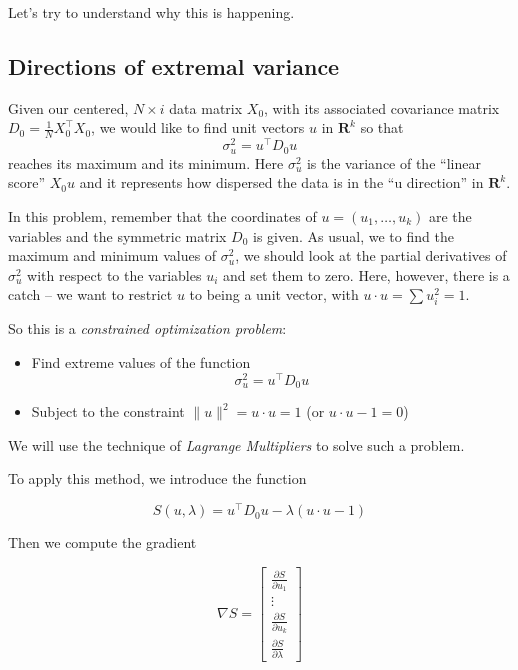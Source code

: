 \documentclass[
  oneside]{scrbook}
\providecommand{\tightlist}{%
  \setlength{\itemsep}{0pt}\setlength{\parskip}{0pt}}
\begin{document}
Let's try to understand why this is happening.

\hypertarget{sec:extremalvariance}{%
\subsection{Directions of extremal
variance}\label{sec:extremalvariance}}

Given our centered, \(N\times i\) data matrix \(X_{0}\), with its
associated covariance matrix
\(D_{0}=\frac{1}{N}X_{0}^{\intercal}X_{0}\), we would like to find unit
vectors \(u\) in \(\mathbf{R}^{k}\) so that \[
\sigma_{u}^{2} = u^{\intercal}D_{0}u
\] reaches its maximum and its minimum. Here \(\sigma_{u}^2\) is the
variance of the ``linear score'' \(X_{0}u\) and it represents how
dispersed the data is in the ``u direction'' in \(\mathbf{R}^{k}\).

In this problem, remember that the coordinates of
\(u=(u_1,\ldots, u_{k})\) are the variables and the symmetric matrix
\(D_{0}\) is given. As usual, we to find the maximum and minimum values
of \(\sigma_{u}^{2}\), we should look at the partial derivatives of
\(\sigma_{u}^{2}\) with respect to the variables \(u_{i}\) and set them
to zero. Here, however, there is a catch -- we want to restrict \(u\) to
being a unit vector, with \(u\cdot u =\sum u_{i}^2=1\).

So this is a \emph{constrained optimization problem}:

\begin{itemize}
\tightlist
\item
  Find extreme values of the function \[
  \sigma_{u}^{2} = u^{\intercal}D_{0}u
  \]
\item
  Subject to the constraint \(\|u\|^2 = u\cdot u=1\) (or
  \(u\cdot u-1=0\))
\end{itemize}

We will use the technique of \emph{Lagrange Multipliers} to solve such a
problem.

To apply this method, we introduce the function

\begin{equation}
S(u, \lambda) = u^{\intercal}D_{0}u - \lambda(u\cdot u -1)
\label{eq:lagrange}\end{equation}

Then we compute the gradient

\begin{equation}
\nabla S = \left[\begin{matrix} \frac{\partial S}{\partial u_{1}} \\ \vdots \\ \frac{\partial S}{\partial u_{k}} \\ \frac{\partial S}{\partial \lambda}\end{matrix}\right]
\label{eq:lagrangegradient}\end{equation}
\end{document}
